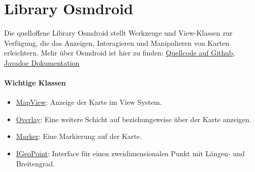 \section{Library Osmdroid}
Die quelloffene Library Osmdroid stellt Werkzeuge und View-Klassen zur Verfügung, die das Anzeigen, 
Interagieren und Manipulieren von Karten erleichtern.
Mehr über Osmdroid ist hier zu finden:
\href{https://github.com/osmdroid/osmdroid}{Quellcode auf Github}, 
\href{https://osmdroid.github.io/osmdroid/javadoc.html}{Javadoc Dokumentation}
\paragraph*{Wichtige Klassen}
\begin{itemize}
    \item \href{https://osmdroid.github.io/osmdroid/javadocAll/org/osmdroid/views/MapView.html}
    {MapView}: Anzeige der Karte im View System.
    \item \href{https://osmdroid.github.io/osmdroid/javadocAll/org/osmdroid/views/overlay/Overlay.html}
    {Overlay}: Eine weitere Schicht auf beziehungsweise über der Karte anzeigen.
    \item \href{https://osmdroid.github.io/osmdroid/javadocAll/org/osmdroid/views/overlay/Marker.html}
    {Marker}: Eine Markierung auf der Karte.
    \item \href{https://osmdroid.github.io/osmdroid/javadocAll/org/osmdroid/api/IGeoPoint.html}
    {IGeoPoint}: Interface für einen zweidimensionalen Punkt mit Längen- und Breitengrad.
\end{itemize}
